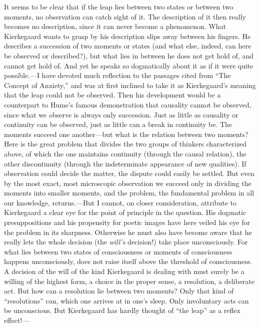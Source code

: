 \documentclass[12pt,a4paper]{book}
\newcommand{\opage}[1]{\marginnote{\footnotesize\textit{[#1]}}}
\begin{document}
It seems to be clear that if the leap lies between two states or between
two moments, no observation can catch sight of it. The description of it
then really becomes no description, since it can never become a
phenomenon. What Kierkegaard wants to grasp by his description slips away
between his fingers. He describes a succession of two moments or states
(and what else, indeed, can here be observed or described?), but what
lies in between he does not get hold of, and cannot get hold of. And yet
he speaks so dogmatically about it as if it were quite possible.---I have
devoted much reflection to the passages cited from ``The Concept of
Anxiety,'' and was at first inclined to take it as Kierkegaard's meaning
that the leap could not be observed. Then his development would be a
counterpart to Hume's famous demonstration that causality cannot be
observed, since what we observe is always only succession. Just as little
as causality or continuity can be observed, just as little can a break in
continuity be. The moments succeed one another---but what is the relation
between two moments? Here is the great problem that divides the two
groups of thinkers characterized above, of which the one maintains
continuity (through the causal relation), the other discontinuity
(through the indeterminate appearance of new qualities). If observation
could decide the matter, the dispute could easily be settled. But even by
the most exact, most microscopic observation we succeed only in dividing
the moments into smaller moments, and the problem, the fundamental
problem in all our knowledge, returns.---But I cannot, on
\opage{80}closer consideration, attribute to Kierkegaard a clear eye for the point
of principle in the question. His dogmatic presuppositions and his
propensity for poetic images have here veiled his eye for the problem in
its sharpness. Otherwise he must also have become aware that he really
lets the whole decision (the \textit{will's} decision!) take place
unconsciously. For what lies between two states of consciousness or
moments of consciousness happens unconsciously, does not raise itself
above the threshold of consciousness. A decision of the will of the kind
Kierkegaard is dealing with must surely be a willing of the highest form,
a choice in the proper sense, a resolution, a deliberate act. But how can
a resolution lie between two moments? Only that kind of ``resolutions''
can, which one arrives at in one's sleep. Only involuntary acts can be
unconscious. But Kierkegaard has hardly thought of ``the leap'' as a
reflex effect!---
\end{document}

